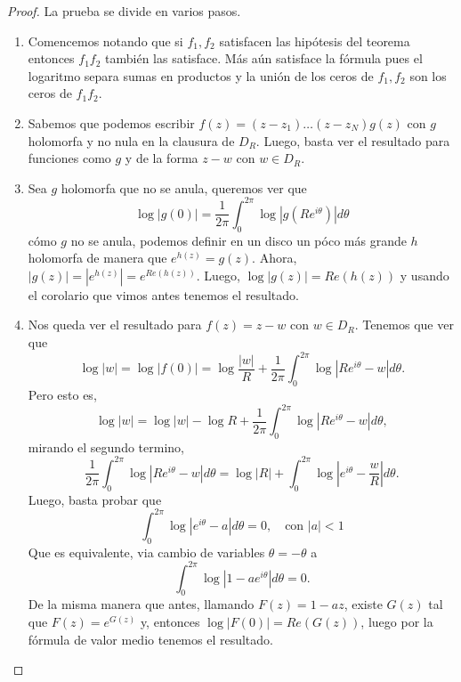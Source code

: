 \documentclass[
]{kaohandt}
\begin{document}
	\begin{proof}
		La prueba se divide en varios pasos.
		\begin{enumerate}
			\item Comencemos notando que si $f_1, f_2$ satisfacen las hipótesis del teorema entonces $f_1f_2$ también las satisface. Más aún satisface la fórmula pues el logaritmo separa sumas en productos y la unión de los ceros de $f_1, f_2$ son los ceros de $f_1f_2.$
			
			\item Sabemos que podemos escribir $f(z) = (z-z_1)\dots(z-z_N)g(z)$ con $g$ holomorfa y no nula en la clausura de $D_R$. Luego, basta ver el resultado para funciones como $g$ y de la forma $z - w$ con $w \in D_R.$
			
			\item Sea $g$ holomorfa que no se anula, queremos ver que
			$$\log{|g(0)|} = \frac{1}{2\pi} \int_{0}^{2\pi} \log{|g(Re^{i\theta})|}d\theta $$
			cómo $g$ no se anula, podemos definir en un disco un póco más grande $h$ holomorfa de manera que $e^{h(z)} = g(z).$ Ahora, $|g(z)| = |e^{h(z)}| = e^{Re(h(z))}.$ Luego, $\log{|g(z)|} = Re(h(z))$ y usando el corolario que vimos antes tenemos el resultado. 
			
			\item Nos queda ver el resultado para $f(z) = z - w$ con $w \in D_R.$ Tenemos que ver que
			$$\log{|w|} = \log{|f(0)|} = \log{\frac{|w|}{R}} + \frac{1}{2\pi} \int_{0}^{2\pi} \log{|Re^{i\theta} - w|}d\theta.$$ 
			Pero esto es,
			$$\log{|w|} = \log{|w|} - \log{R} + \frac{1}{2\pi} \int_{0}^{2\pi} \log{|Re^{i\theta} - w|}d\theta,$$
			mirando el segundo termino,
			$$ \frac{1}{2\pi} \int_{0}^{2\pi} \log{|Re^{i\theta} - w|}d\theta = \log{|R|} + \int_{0}^{2\pi} \log{|e^{i\theta} - \frac{w}{R}|}d\theta.$$
			Luego, basta probar que
			$$\int_{0}^{2\pi} \log{|e^{i\theta} - a|}d\theta = 0, \quad \text{con } |a| < 1$$
			Que es equivalente, via cambio de variables $\theta = -\theta$ a
			$$\int_{0}^{2\pi} \log{|1 - ae^{i\theta}|}d\theta = 0.$$
			De la misma manera que antes, llamando $F(z) = 1 - az$, existe $G(z)$ tal que $F(z) = e^{G(z)}$ y, entonces $\log|F(0)| = Re(G(z))$, luego por la fórmula de valor medio tenemos el resultado.
		\end{enumerate}
		
	\end{proof}
	
\end{document}
